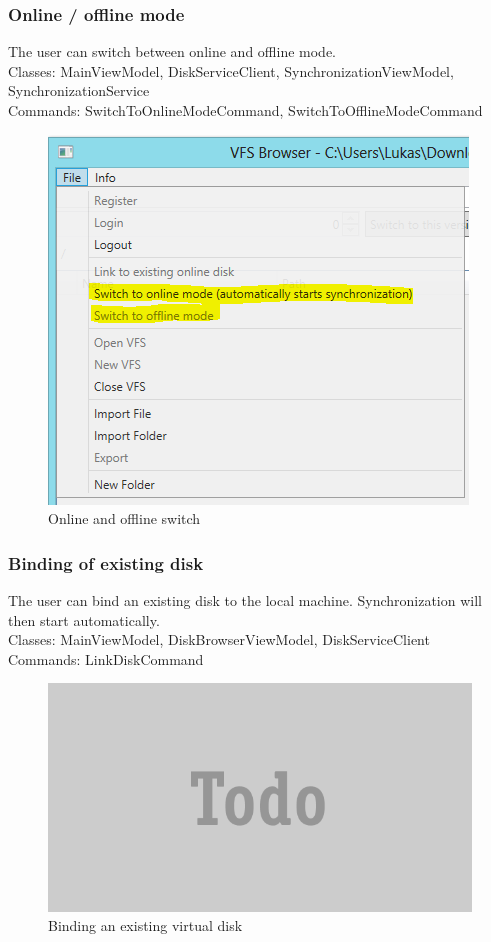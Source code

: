 \documentclass[JCDReport.tex]{subfiles}
\begin{document}
\subsubsection{Online / offline mode}
The user can switch between online and offline mode.\\
Classes: MainViewModel, DiskServiceClient, SynchronizationViewModel, SynchronizationService\\
Commands: SwitchToOnlineModeCommand, SwitchToOfflineModeCommand
\begin{figure}[h!]
	\centering
	\includegraphics[scale=1]{imageslukas/onlineofflinemode.png} 
	\caption{Online and offline switch}
\end{figure}	

\subsubsection{Binding of existing disk}
The user can bind an existing disk to the local machine. Synchronization will then start automatically.\\
Classes: MainViewModel, DiskBrowserViewModel, DiskServiceClient\\
Commands: LinkDiskCommand
\begin{figure}[h!]
	\centering
	\includegraphics[scale=1]{imageslukas/todo.png} 
	\caption{Binding an existing virtual disk}
\end{figure}	
\end{document}

